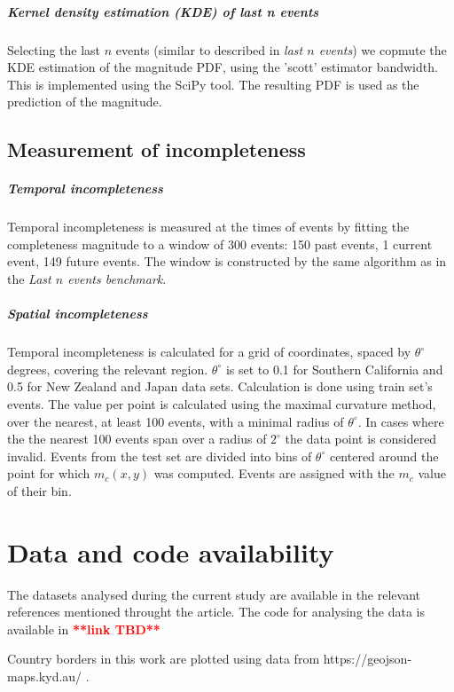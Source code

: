 \documentclass[pdflatex]{sn-jnl}
\begin{document}
\subparagraph{Kernel density estimation (KDE) of last n events} Selecting the last $n$ events (similar to described in \textit{last $n$ events}) we copmute the KDE estimation of the magnitude PDF, using the 'scott' estimator bandwidth\cite{scott_2015}. This is implemented using the SciPy tool\cite{scipy_2020}. The resulting PDF is used as the prediction of the magnitude.

\subsection{Measurement of incompleteness}
\subparagraph{Temporal incompleteness} Temporal incompleteness is measured at the times of events by fitting the completeness magnitude to a window of 300 events: 150 past events, 1 current event, 149 future events. The window is constructed by the same algorithm as in the \textit{Last $n$ events benchmark}.

\subparagraph{Spatial incompleteness} Temporal incompleteness is calculated for a grid of coordinates, spaced by $\theta^\circ$ degrees, covering the relevant region. $\theta^\circ$ is set to 0.1 for Southern California and 0.5 for New Zealand and Japan data sets. Calculation is done using train set's events. The value per point is calculated using the maximal curvature method\cite{wiemer_minimum_2000}, over the nearest, at least 100 events, with a minimal radius of $\theta^\circ$. In cases where the the nearest 100 events span over a radius of $2^\circ$ the data point is considered invalid. Events from the test set are divided into bins of $\theta^\circ$ centered around the point for which $m_c(x,y)$ was computed. Events are assigned with the $m_c$ value of their bin.


\section*{Data and code availability}
The datasets analysed during the current study are available in the relevant references mentioned throught the article.
The code for analysing the data is available in \textcolor{red}{\textbf{**link TBD**}}

Country borders in this work are plotted using data from https://geojson-maps.kyd.au/ .
\end{document}
